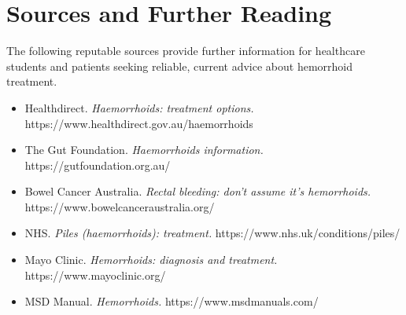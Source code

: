 \section*{Sources and Further Reading}
The following reputable sources provide further information for healthcare students and patients seeking reliable, current advice about hemorrhoid treatment.

\begin{itemize}
    \item Healthdirect. \textit{Haemorrhoids: treatment options.} https://www.healthdirect.gov.au/haemorrhoids
    \item The Gut Foundation. \textit{Haemorrhoids information.} https://gutfoundation.org.au/
    \item Bowel Cancer Australia. \textit{Rectal bleeding: don't assume it's hemorrhoids.} https://www.bowelcanceraustralia.org/
    \item NHS. \textit{Piles (haemorrhoids): treatment.} https://www.nhs.uk/conditions/piles/
    \item Mayo Clinic. \textit{Hemorrhoids: diagnosis and treatment.} https://www.mayoclinic.org/
    \item MSD Manual. \textit{Hemorrhoids.} https://www.msdmanuals.com/
\end{itemize}
